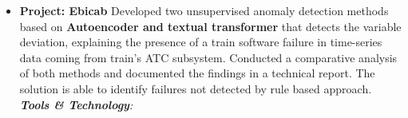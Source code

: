 \documentclass[letterpaper]{DS_class_file} %
\begin{document}
\begin{twenty}
{\begin{itemize}
            \item \textbf{Project: Ebicab} Developed two unsupervised anomaly detection methods based on \textbf{Autoencoder and textual transformer} that detects the variable deviation, explaining the presence of a train software failure in time-series data coming from train's ATC subsystem. Conducted a comparative analysis of both methods and documented the findings in a technical report. The solution is able to identify failures not detected by rule based approach.
            \newline \textit{\textbf{Tools \& Technology}:      } 
        \end{itemize}
		}

\end{twenty}
\end{document}
